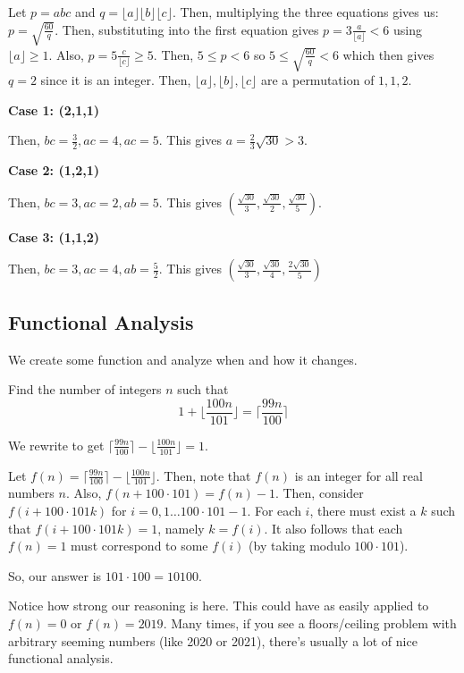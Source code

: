 \documentclass{article}
\begin{document}
\begin{sol}
Let $p=abc$ and $q=\lfloor a \rfloor \lfloor b \rfloor \lfloor c \rfloor$. Then, multiplying the three equations gives us: $p=\sqrt{\frac{60}{q}}$. Then, substituting into the first equation gives $p=3\frac{a}{\lfloor a \rfloor}< 6$ using $\lfloor a\rfloor \ge 1$. Also, $p=5\frac{c}{\lfloor c \rfloor}\ge 5$. Then, $5\leq p < 6$ so $5\leq \sqrt{\frac{60}{q}} < 6$ which then gives $q=2$ since it is an integer. Then, $\lfloor a \rfloor, \lfloor b \rfloor, \lfloor c \rfloor $ are a permutation of $1,1,2$.

\textbf{Case 1: (2,1,1)} 

Then, $bc=\frac{3}{2}, ac=4,ac=5$. This gives $a=\frac{2}{3}\sqrt{30}>3$.

\textbf{Case 2: (1,2,1)}

Then, $bc=3,ac=2,ab=5$. This gives $(\frac{\sqrt{30}}{3}, \frac{\sqrt{30}}{2}, \frac{\sqrt{30}}{5})$.

\textbf{Case 3: (1,1,2)}

Then, $bc=3,ac=4,ab=\frac{5}{2}$. This gives $(\frac{\sqrt{30}}{3}, \frac{\sqrt{30}}{4}, \frac{2\sqrt{30}}{5})$
\end{sol}

\subsection{Functional Analysis}
We create some function and analyze when and how it changes.
\begin{exam}
Find the number of integers $n$ such that
$$1+\lfloor \frac{100n}{101} \rfloor = \lceil \frac{99n}{100} \rceil$$
\end{exam}

\begin{sol}
We rewrite to get
$\lceil \frac{99n}{100} \rceil - \lfloor \frac{100n}{101} \rfloor = 1$.

Let $f(n)=\lceil \frac{99n}{100} \rceil - \lfloor \frac{100n}{101} \rfloor$. Then, note that $f(n)$ is an integer for all real numbers $n$. Also, $f(n+100\cdot 101)=f(n)-1$. Then, consider $f(i+100\cdot 101k)$ for $i=0,1\ldots 100\cdot 101-1$. For each $i$, there must exist a $k$ such that $f(i+100\cdot 101k)=1$, namely $k=f(i)$. It also follows that each $f(n)=1$ must correspond to some $f(i)$ (by taking modulo $100\cdot 101$).

So, our answer is $101\cdot 100=\boxed{10100}$.
\end{sol}

Notice how strong our reasoning is here. This could have as easily applied to $f(n)=0$ or $f(n)=2019$. Many times, if you see a floors/ceiling problem with arbitrary seeming numbers (like 2020 or 2021), there's usually a lot of nice functional analysis.
\end{document}
